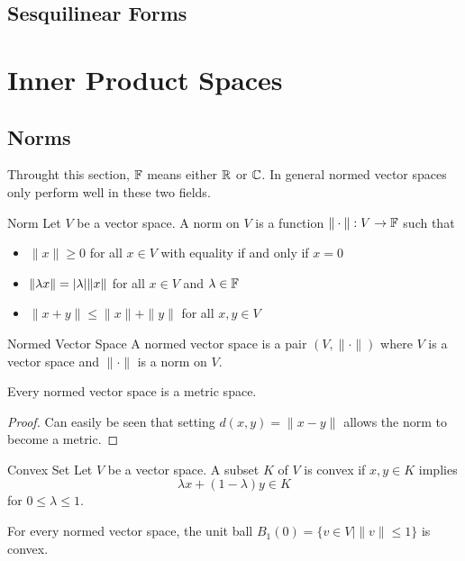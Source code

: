\documentclass[a4paper]{article}
\begin{document}
\subsection{Sesquilinear Forms}

\pagebreak
\section{Inner Product Spaces}
\subsection{Norms}
Throught this section, $\mathbb{F}$ means either $\mathbb{R}$ or $\mathbb{C}$. In general normed vector spaces only perform well in these two fields. 
\begin{defn}{Norm}{} Let $V$ be a vector space. A norm on $V$ is a function $\|\cdot\|:V\to\mathbb{F}$ such that
\begin{itemize}
\item $\|x\|\geq 0$ for all $x\in V$ with equality if and only if $x=0$
\item $\|\lambda x\|=\abs{\lambda}\|x\|$ for all $x\in V$ and $\lambda\in\mathbb{F}$
\item $\|x+y\|\leq\|x\|+\|y\|$ for all $x,y\in V$
\end{itemize}
\end{defn}

\begin{defn}{Normed Vector Space}{} A normed vector space is a pair $(V,\|\cdot\|)$ where $V$ is a vector space and $\|\cdot\|$ is a norm on $V$. 
\end{defn}

\begin{prp}{}{} Every normed vector space is a metric space. \tcbline
\begin{proof} Can easily be seen that setting $d(x,y)=\|x-y\|$ allows the norm to become a metric. 
\end{proof}
\end{prp}

\begin{defn}{Convex Set}{} Let $V$ be a vector space. A subset $K$ of $V$ is convex if $x,y\in K$ implies $$\lambda x+(1-\lambda)y\in K$$ for $0\leq\lambda\leq 1$. 
\end{defn}

\begin{lmm}{}{} For every normed vector space, the unit ball $B_1(0)=\{v\in V|\|v\|\leq 1\}$ is convex. 
\end{lmm}
\end{document}
